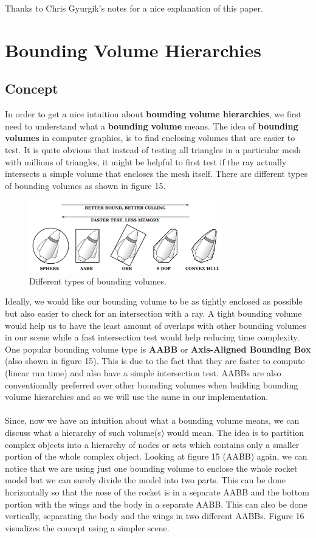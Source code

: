 \documentclass[11pt,a4paper]{article}
\begin{document}
Thanks to Chris Gyurgik's notes \cite{fastvoxeltraversalnotes} for a nice explanation of this paper.
\pagebreak
\section{Bounding Volume Hierarchies}
\subsection{Concept}
In order to get a nice intuition about \textbf{bounding volume hierarchies}, we first need to understand what a \textbf{bounding volume} means. The idea of \textbf{bounding volumes} in computer graphics, is to find enclosing volumes that are easier to test. It is quite obvious that instead of testing all triangles in a particular mesh with millions of triangles, it might be helpful to first test if the ray actually intersects a simple volume that encloses the mesh itself. There are different types of bounding volumes as shown in figure 15.
\begin{figure}[H]
	\centering
	\captionsetup{justification=centering,margin=2cm}
	\includegraphics[width=0.75\textwidth]{boundingvolumes}
	\caption{Different types of bounding volumes. \protect\cite{ericson2004real}}
\end{figure}
Ideally, we would like our bounding volume to be as tightly enclosed as possible but also easier to check for an intersection with a ray. A tight bounding volume would help us to have the least amount of overlaps with other bounding volumes in our scene while a fast intersection test would help reducing time complexity. One popular bounding volume type is \textbf{AABB} or \textbf{Axis-Aligned Bounding Box} (also shown in figure 15). This is due to the fact that they are faster to compute (linear run time) and also have a simple intersection test. AABBs are also conventionally preferred over other bounding volumes when building bounding volume hierarchies and so we will use the same in our implementation.
\\~\\
\noindent
Since, now we have an intuition about what a bounding volume means, we can discuss what a hierarchy of such volume(s) would mean. The idea is to partition complex objects into a hierarchy of nodes or sets which contains only a smaller portion of the whole complex object. Looking at figure 15 (AABB) again, we can notice that we are using just one bounding volume to enclose the whole rocket model but we can surely divide the model into two parts. This can be done horizontally so that the nose of the rocket is in a separate AABB and the bottom portion with the wings and the body in a separate AABB. This can also be done vertically, separating the body and the wings in two different AABBs. Figure 16 visualizes the concept using a simpler scene. 
\end{document}
